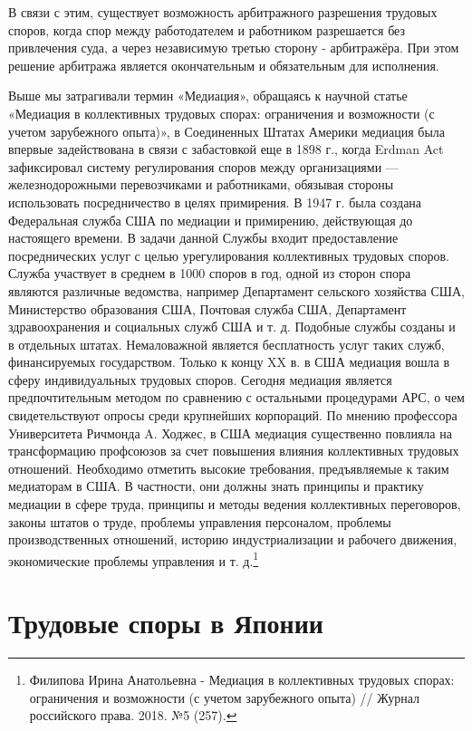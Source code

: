 В связи с этим, существует возможность арбитражного разрешения трудовых споров, когда спор между работодателем и работником разрешается без привлечения суда, а через независимую третью сторону - арбитражёра. При этом решение арбитража является окончательным и обязательным для исполнения.

Выше мы затрагивали термин «Медиация», обращаясь к научной статье «Медиация в коллективных трудовых спорах: ограничения и возможности (с учетом зарубежного опыта)», в Соединенных Штатах Америки медиация была впервые задействована в связи с забастовкой еще в 1898 г., когда Erdman Act зафиксировал систему регулирования споров между организациями — железнодорожными перевозчиками и работниками, обязывая стороны использовать посредничество в целях примирения. 
В 1947 г. была создана Федеральная служба США по медиации и примирению, действующая до настоящего времени. В задачи данной Службы входит предоставление посреднических услуг с целью урегулирования коллективных трудовых споров. Служба участвует в среднем в 1000 споров в год, одной из сторон спора являются различные ведомства, например Департамент сельского хозяйства США, Министерство образования США, Почтовая служба США, Департамент здравоохранения и социальных служб США и т. д. Подобные службы созданы и в отдельных штатах. Немаловажной является бесплатность услуг таких служб, финансируемых государством. Только к концу XX в. в США медиация вошла в сферу индивидуальных трудовых споров. Сегодня медиация является предпочтительным методом по сравнению с остальными процедурами АРС, о чем свидетельствуют опросы среди крупнейших корпораций. По мнению профессора Университета Ричмонда A. Ходжес, в США медиация существенно повлияла на трансформацию профсоюзов за счет повышения влияния коллективных трудовых отношений. 
Необходимо отметить высокие требования, предъявляемые к таким медиаторам в США. В частности, они должны знать принципы и практику медиации в сфере труда, принципы и методы ведения коллективных переговоров, законы штатов о труде, проблемы управления персоналом, проблемы производственных отношений, историю индустриализации и рабочего движения, экономические проблемы управления и т. д.\footnote{Филипова Ирина Анатольевна - Медиация в коллективных трудовых спорах: ограничения и возможности (с учетом зарубежного опыта) // Журнал российского права. 2018. №5 (257).}

\section{Трудовые споры в Японии}

